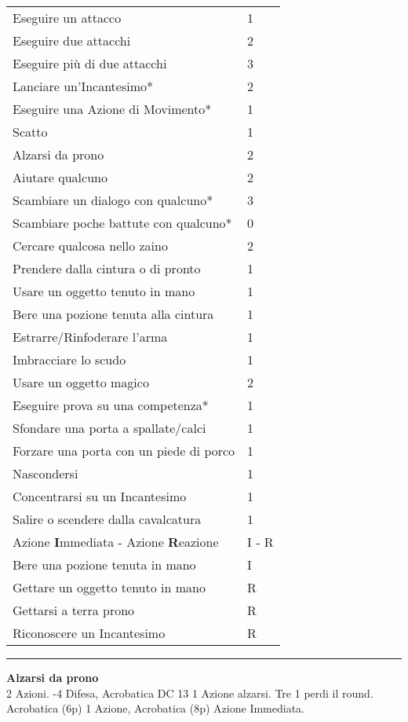 \documentclass[a4paper,12 pt,openany]{book}
\newcommand{\riga}{\rule{\textwidth}{0.4pt}}
\begin{document}
\begin{textblock*}{8.3cm}
\begin{tabular}{ll}
Eseguire un attacco				& 1\\
Eseguire due attacchi				& 2\\
Eseguire più di due attacchi			& 3\\
Lanciare un'Incantesimo*			& 2\\
Eseguire una Azione di  Movimento*		& 1\\
Scatto						& 1\\
Alzarsi da prono				& 2\\
Aiutare qualcuno				& 2\\
Scambiare un dialogo con qualcuno*		& 3\\
\small{Scambiare poche battute con qualcuno*}	& 0\\
Cercare qualcosa nello zaino			& 2\\
{\small Prendere dalla cintura o di pronto} & 1\\
Usare un oggetto tenuto in mano			& 1\\
Bere una pozione tenuta alla cintura		& 1\\
Estrarre/Rinfoderare l'arma					& 1\\
Imbracciare lo scudo				& 1\\
Usare un oggetto magico				& 2\\
Eseguire prova su una competenza*		& 1\\
Sfondare una porta a spallate/calci			&1\\
Forzare una porta con un piede di porco		&1\\
Nascondersi					& 1\\
Concentrarsi su un Incantesimo			& 1\\
Salire o scendere dalla cavalcatura		& 1\\
Azione \textbf{I}mmediata - Azione \textbf{R}eazione		& I - R\\
Bere una pozione tenuta in mano			& I\\
Gettare un oggetto tenuto in mano		& R\\
Gettarsi a terra prono				& R\\
Riconoscere un Incantesimo			& R\\
\end{tabular}

\riga

\textbf{Alzarsi da prono}\\
2 Azioni. -4 Difesa, Acrobatica DC 13 1 Azione alzarsi. Tre 1 perdi il round. Acrobatica (6p) 1 Azione, Acrobatica (8p) Azione Immediata.


\end{textblock*}
\end{document}
